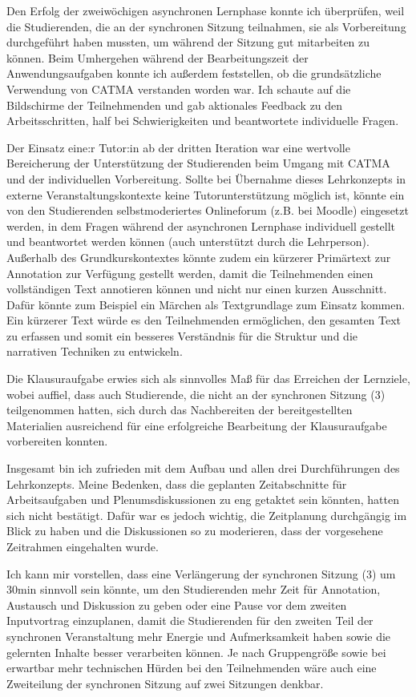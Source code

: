 \documentclass[
          a4paper,
        ]{article}
\begin{document}
Den Erfolg der zweiwöchigen asynchronen Lernphase konnte ich überprüfen,
weil die Studierenden, die an der synchronen Sitzung teilnahmen, sie als
Vorbereitung durchgeführt haben mussten, um während der Sitzung gut
mitarbeiten zu können. Beim Umhergehen während der Bearbeitungszeit der
Anwendungsaufgaben konnte ich außerdem feststellen, ob die
grundsätzliche Verwendung von CATMA verstanden worden war. Ich schaute
auf die Bildschirme der Teilnehmenden und gab aktionales Feedback zu den
Arbeitsschritten, half bei Schwierigkeiten und beantwortete individuelle
Fragen.

Der Einsatz eine:r Tutor:in ab der dritten Iteration war eine wertvolle
Bereicherung der Unterstützung der Studierenden beim Umgang mit CATMA
und der individuellen Vorbereitung. Sollte bei Übernahme dieses
Lehrkonzepts in externe Veranstaltungskontexte keine Tutorunterstützung
möglich ist, könnte ein von den Studierenden selbstmoderiertes
Onlineforum (z.B. bei Moodle) eingesetzt werden, in dem Fragen während
der asynchronen Lernphase individuell gestellt und beantwortet werden
können (auch unterstützt durch die Lehrperson). Außerhalb des
Grundkurskontextes könnte zudem ein kürzerer Primärtext zur Annotation
zur Verfügung gestellt werden, damit die Teilnehmenden einen
vollständigen Text annotieren können und nicht nur einen kurzen
Ausschnitt. Dafür könnte zum Beispiel ein Märchen als Textgrundlage zum
Einsatz kommen. Ein kürzerer Text würde es den Teilnehmenden
ermöglichen, den gesamten Text zu erfassen und somit ein besseres
Verständnis für die Struktur und die narrativen Techniken zu entwickeln.

Die Klausuraufgabe erwies sich als sinnvolles Maß für das Erreichen der
Lernziele, wobei auffiel, dass auch Studierende, die nicht an der
synchronen Sitzung (3) teilgenommen hatten, sich durch das Nachbereiten
der bereitgestellten Materialien ausreichend für eine erfolgreiche
Bearbeitung der Klausuraufgabe vorbereiten konnten.

Insgesamt bin ich zufrieden mit dem Aufbau und allen drei Durchführungen
des Lehrkonzepts. Meine Bedenken, dass die geplanten Zeitabschnitte für
Arbeitsaufgaben und Plenumsdiskussionen zu eng getaktet sein könnten,
hatten sich nicht bestätigt. Dafür war es jedoch wichtig, die
Zeitplanung durchgängig im Blick zu haben und die Diskussionen so zu
moderieren, dass der vorgesehene Zeitrahmen eingehalten wurde.

Ich kann mir vorstellen, dass eine Verlängerung der synchronen Sitzung
(3) um 30min sinnvoll sein könnte, um den Studierenden mehr Zeit für
Annotation, Austausch und Diskussion zu geben oder eine Pause vor dem
zweiten Inputvortrag einzuplanen, damit die Studierenden für den zweiten
Teil der synchronen Veranstaltung mehr Energie und Aufmerksamkeit haben
sowie die gelernten Inhalte besser verarbeiten können. Je nach
Gruppengröße sowie bei erwartbar mehr technischen Hürden bei den
Teilnehmenden wäre auch eine Zweiteilung der synchronen Sitzung auf zwei
Sitzungen denkbar.
\end{document}
